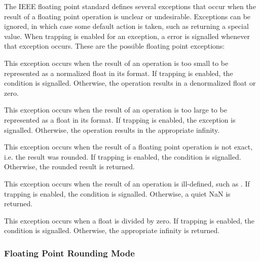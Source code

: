 The IEEE floating point standard defines several exceptions that occur
when the result of a floating point operation is unclear or
undesirable.  Exceptions can be ignored, in which case some default
action is taken, such as returning a special value.  When trapping is
enabled for an exception, a error is signalled whenever that exception
occurs.  These are the possible floating point exceptions:
\begin{Lentry}
  
\item[\kwd{underflow}] This exception occurs when the result of an
  operation is too small to be represented as a normalized float in
  its format.  If trapping is enabled, the
   condition is signalled.
  Otherwise, the operation results in a denormalized float or zero.
  
\item[\kwd{overflow}] This exception occurs when the result of an
  operation is too large to be represented as a float in its format.
  If trapping is enabled, the 
  exception is signalled.  Otherwise, the operation results in the
  appropriate infinity.
  
\item[\kwd{inexact}] This exception occurs when the result of a
  floating point operation is not exact, i.e. the result was rounded.
  If trapping is enabled, the 
  condition is signalled.  Otherwise, the rounded result is returned.
  
\item[\kwd{invalid}] This exception occurs when the result of an
  operation is ill-defined, such as .  If
  trapping is enabled, the 
  condition is signalled.  Otherwise, a quiet NaN is returned.
  
\item[\kwd{divide-by-zero}] This exception occurs when a float is
  divided by zero.  If trapping is enabled, the
   condition is signalled.  Otherwise, the
  appropriate infinity is returned.
\end{Lentry}

\subsubsection{Floating Point Rounding Mode}
\label{float-rounding-modes}

